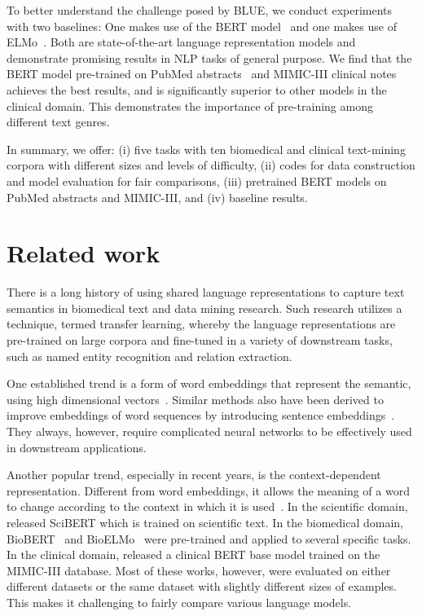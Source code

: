 \documentclass[11pt,a4paper]{article}
\begin{document}
To better understand the challenge posed by BLUE, we conduct experiments with two baselines: One makes use of the BERT model~\cite{devlin2018bert} and one makes use of ELMo~\cite{peters2017semi}. Both are state-of-the-art language representation models and demonstrate promising results in NLP tasks of general purpose. We find that the BERT model pre-trained on PubMed abstracts~\cite{fiorini2018how} and MIMIC-III clinical notes~\cite{johnson2016mimic} achieves the best results, and is significantly superior to other models in the clinical domain. This demonstrates the importance of pre-training among different text genres.

In summary, we offer: (i) five tasks with ten biomedical and clinical text-mining corpora with different sizes and levels of difficulty, (ii) codes for data construction and model evaluation for fair comparisons, (iii) pretrained BERT models on PubMed abstracts and MIMIC-III, and (iv) baseline results.

\section{Related work}

There is a long history of using shared language representations to capture text semantics in biomedical text and data mining research. Such research utilizes a technique, termed transfer learning, whereby the language representations are pre-trained on large corpora and fine-tuned in a variety of downstream tasks, such as named entity recognition and relation extraction.

One established trend is a form of word embeddings that represent the semantic, using high dimensional vectors~\cite{chiu2016how,wang2018comparison,zhang2019improving}. Similar methods also have been derived to improve embeddings of word sequences by introducing sentence embeddings~\cite{chen2018biosentvec}. They always, however, require complicated neural networks to be effectively used in downstream applications.

Another popular trend, especially in recent years, is the context-dependent representation. Different from word embeddings, it allows the meaning of a word to change according to the context in which it is used~\cite{melamud2016role,peters2017semi,devlin2018bert,dai2019transformer}. In the scientific domain, \citet{beltagy2019scibert} released SciBERT which is trained on scientific text. In the biomedical domain, BioBERT~\cite{lee2019biobert} and BioELMo~\cite{jin2019probing} were pre-trained and applied to several specific tasks. In the clinical domain, \citet{alsentzer2019publicly} released a clinical BERT base model trained on the MIMIC-III database. Most of these works, however, were evaluated on either different datasets or the same dataset with slightly different sizes of examples. This makes it challenging to fairly compare various language models. 
\end{document}
